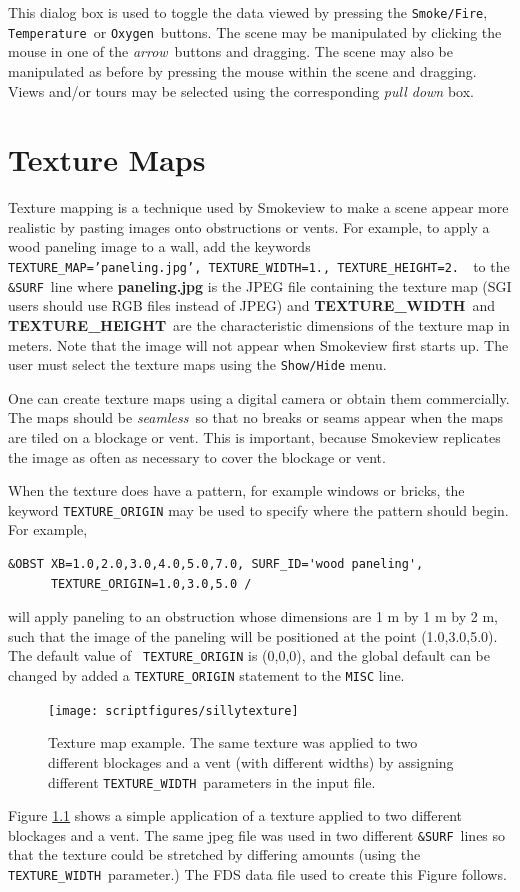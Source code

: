 \documentclass[11pt,twoside]{book}
\newcommand{\figoptions}{hbp}
\begin{document}
This dialog box is used to toggle the data viewed by pressing the {\tt Smoke/Fire},
{\tt Temperature}\ or {\tt Oxygen}\ buttons.  The scene may be manipulated by clicking the mouse in one of the
{\em arrow}\ buttons and dragging.  The scene may also
be manipulated as before by pressing the mouse within the scene and dragging.  Views and/or tours may be selected
using the corresponding {\em pull down} box.

\chapter{Texture Maps} Texture mapping is a technique used by
Smokeview to make a scene appear more realistic by pasting images
onto obstructions or vents. For example, to apply a wood paneling
image to a wall, add the keywords {\tt
TEXTURE\_MAP='paneling.jpg', TEXTURE\_WIDTH=1., TEXTURE\_HEIGHT=2.
}\ to the {\tt \&SURF}\ line where {\bf paneling.jpg} is the JPEG
file containing the texture map (SGI users should use RGB files
instead of JPEG) and {\bf TEXTURE\_WIDTH}\ and {\bf
TEXTURE\_HEIGHT}\ are the characteristic dimensions of the texture
map in meters. Note that the image will not appear when Smokeview
first starts up. The user must select the texture maps using the
{\tt Show/Hide} menu.

One can create texture maps using a digital camera or obtain them
commercially.  The maps should be {\em seamless}\ so that no
breaks or seams appear when the maps are tiled on a blockage or
vent.  This is important, because Smokeview replicates the image
as often as necessary to cover the blockage or vent.

When the texture does have a pattern, for example windows or
bricks, the keyword {\tt TEXTURE\_ORIGIN} may be used to specify
where the pattern should begin.  For example,
\begin{verbatim}
&OBST XB=1.0,2.0,3.0,4.0,5.0,7.0, SURF_ID='wood paneling',
      TEXTURE_ORIGIN=1.0,3.0,5.0 /
\end{verbatim}
\noindent will apply paneling to an obstruction whose dimensions
are 1 m by 1 m by 2 m, such that the image of the paneling will be
positioned at the point (1.0,3.0,5.0). The default value of {\tt
TEXTURE\_ORIGIN} is (0,0,0), and the global default can be changed
by added a {\tt TEXTURE\_ORIGIN} statement to the {\tt MISC} line.

\begin{figure}[\figoptions]
\centerline{\texttt{[image: scriptfigures/sillytexture]}
} \caption [Texture map example.] {
Texture map example.  The same texture was applied to two different
blockages and a vent (with different widths) by assigning different {\tt TEXTURE\_WIDTH}\
parameters in the input file.
} \label{figTextures}
\end{figure}
Figure \ref{figTextures} shows a simple application of a texture
applied to two different blockages and a vent.  The same jpeg file
was used in two different {\tt \&SURF}\ lines so that the texture
could be stretched by differing amounts (using the {\tt
TEXTURE\_WIDTH}\ parameter.)  The FDS data file used to create
this Figure follows.
\end{document}
